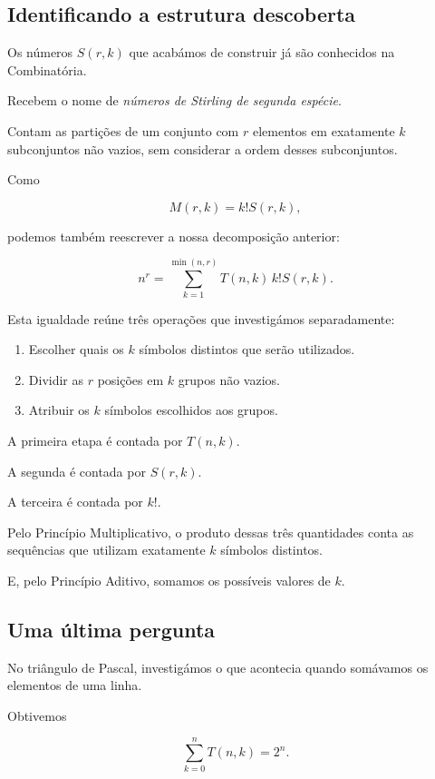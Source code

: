 \documentclass[11pt,a4paper,oneside]{book}
\begin{document}
\subsection*{Identificando a estrutura descoberta}

Os números $S(r,k)$ que acabámos
de construir já são conhecidos
na Combinatória.

Recebem o nome de
\emph{números de Stirling de segunda espécie}.

Contam as partições de um conjunto
com $r$ elementos em exatamente
$k$ subconjuntos não vazios,
sem considerar a ordem desses subconjuntos.

Como

\[
M(r,k)=k!S(r,k),
\]

podemos também reescrever
a nossa decomposição anterior:

\[
n^r=
\sum_{k=1}^{\min(n,r)}
T(n,k)\,k!S(r,k).
\]

Esta igualdade reúne três operações
que investigámos separadamente:

\begin{enumerate}
\item Escolher quais os $k$ símbolos
distintos que serão utilizados.

\item Dividir as $r$ posições em
$k$ grupos não vazios.

\item Atribuir os $k$ símbolos
escolhidos aos grupos.
\end{enumerate}

A primeira etapa é contada por $T(n,k)$.

A segunda é contada por $S(r,k)$.

A terceira é contada por $k!$.

Pelo Princípio Multiplicativo,
o produto dessas três quantidades
conta as sequências que utilizam
exatamente $k$ símbolos distintos.

E, pelo Princípio Aditivo,
somamos os possíveis valores de $k$.

\subsection*{Uma última pergunta}

No triângulo de Pascal,
investigámos o que acontecia
quando somávamos os elementos
de uma linha.

Obtivemos

\[
\sum_{k=0}^{n}T(n,k)=2^n.
\]
\end{document}

